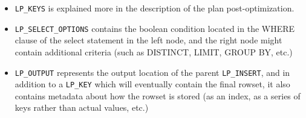 \documentclass[]{article}
\def\code#1{\texttt{#1}}
\begin{document}
\begin{itemize}
	\item \code{LP\_KEYS} is explained more in the description of the plan post-optimization.
	\item \code{LP\_SELECT\_OPTIONS} contains the boolean condition located in the WHERE clause of the select statement in the left node, and the right node might contain additional criteria (such as DISTINCT, LIMIT, GROUP BY, etc.)
	\item \code{LP\_OUTPUT} represents the output location of the parent \code{LP\_INSERT}, and in addition to a \code{LP\_KEY} which will eventually contain the final rowset, it also contains metadata about how the rowset is stored (as an index, as a series of keys rather than actual values, etc.)
\end{itemize}
\end{document}
